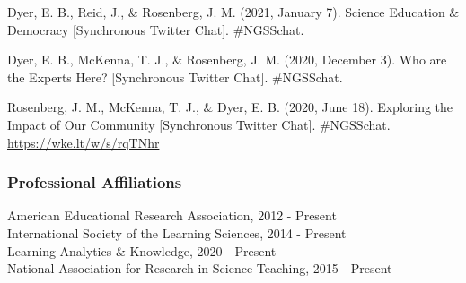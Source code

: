 \documentclass[
  14,
]{article}
\begin{document}
Dyer, E. B., Reid, J., \& Rosenberg, J. M. (2021, January 7). Science
Education \& Democracy {[}Synchronous Twitter Chat{]}. \#NGSSchat.

Dyer, E. B., McKenna, T. J., \& Rosenberg, J. M. (2020, December 3). Who
are the Experts Here? {[}Synchronous Twitter Chat{]}. \#NGSSchat.

Rosenberg, J. M., McKenna, T. J., \& Dyer, E. B. (2020, June 18).
Exploring the Impact of Our Community {[}Synchronous Twitter Chat{]}.
\#NGSSchat. \url{https://wke.lt/w/s/rqTNhr}

\hypertarget{professional-affiliations}{%
\subsubsection{Professional
Affiliations}\label{professional-affiliations}}

American Educational Research Association, 2012 - Present\\
International Society of the Learning Sciences, 2014 - Present\\
Learning Analytics \& Knowledge, 2020 - Present\\
National Association for Research in Science Teaching, 2015 - Present
\end{document}
